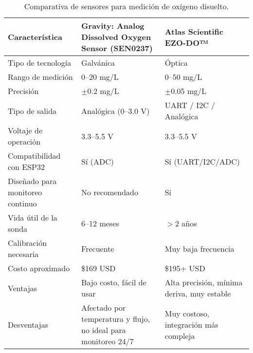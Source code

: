 \begin{table}[H]
    \centering
    \renewcommand{\arraystretch}{1.5} %
    
    \begin{tabular}{
        |p{4cm}    %
        |p{5cm}    %
        |p{5cm}|   %
    }
    \hline
    \textbf{Característica} 
        & \textbf{Gravity: Analog Dissolved Oxygen Sensor (SEN0237)} 
        & \textbf{Atlas Scientific EZO-DO™} \\ 
    \hline
    
    Tipo de tecnología 
        & Galvánica 
        & Óptica \\ 
    \hline
    
    Rango de medición 
        & 0--20 mg/L 
        & 0--50 mg/L \\ 
    \hline
    
    Precisión 
        & $\pm$0.2 mg/L 
        & $\pm$0.05 mg/L \\ 
    \hline
    
    Tipo de salida 
        & Analógica (0--3.0 V) 
        & UART / I2C / Analógica \\ 
    \hline
    
    Voltaje de operación 
        & 3.3--5.5 V 
        & 3.3--5.5 V \\ 
    \hline
    
    Compatibilidad con ESP32 
        & Sí (ADC) 
        & Sí (UART/I2C/ADC) \\ 
    \hline
    
    Diseñado para monitoreo continuo 
        & No recomendado 
        & Sí \\ 
    \hline
    
    Vida útil de la sonda 
        & 6--12 meses 
        & $>$2 años \\ 
    \hline
    
    Calibración necesaria 
        & Frecuente 
        & Muy baja frecuencia \\ 
    \hline
    
    Costo aproximado 
        & \$169 USD 
        & \$195+ USD \\ 
    \hline
    
    Ventajas 
        & Bajo costo, fácil de usar 
        & Alta precisión, mínima deriva, muy estable \\ 
    \hline
    
    Desventajas 
        & Afectado por temperatura y flujo, no ideal para monitoreo 24/7 
        & Muy costoso, integración más compleja \\ 
    \hline
    \end{tabular}
    
    \caption{Comparativa de sensores para medición de oxígeno disuelto.}
    \label{tab:sensores_od}
\end{table}


